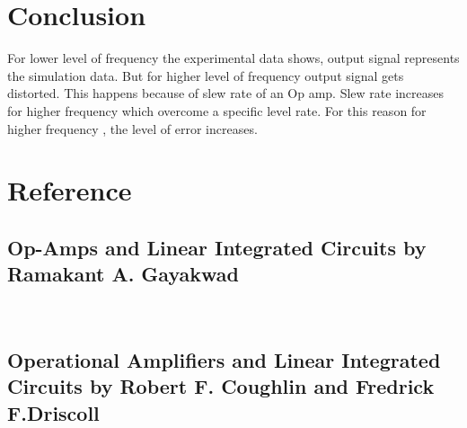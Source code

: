 \documentclass[12pt]{article}
\begin{document}
\section{Conclusion}
For lower level of frequency the experimental data shows, output signal represents the simulation data. But for higher level of frequency output signal gets distorted. This happens because of slew rate of an Op amp. Slew rate increases for higher frequency which overcome a specific level rate. For this reason for higher frequency , the level of error increases.

\section{Reference}
\subsection{Op-Amps and Linear Integrated Circuits by Ramakant A. Gayakwad}\\
\subsection{Operational Amplifiers and Linear Integrated Circuits by Robert F. Coughlin and Fredrick F.Driscoll}
\end{document}
